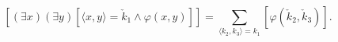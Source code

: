 $$[(\exists x)(\exists y)[\langle x, y \rangle = \check{k}_1 \land \varphi(x, y)]] = \sum_{\langle k_2, k_3 \rangle = k_1} [\varphi(\check{k}_2, \check{k}_3)].$$